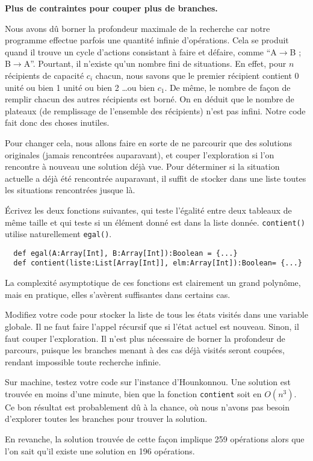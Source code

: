 \documentclass[10pt]{article}\usepackage[correction,nu]{esial}%
\begin{document}
\begin{Exercice}
  \textbf{Plus de contraintes pour couper plus de branches.} 
  
  Nous avons dû borner la profondeur maximale de la recherche car notre
  programme effectue parfois une quantité infinie d'opérations. Cela se produit
  quand il trouve un cycle d'actions consistant à faire et défaire, comme
  ``A$\rightarrow$B ; B$\rightarrow$A''. Pourtant, il n'existe qu'un nombre fini
  de situations. En effet, pour $n$ récipients de capacité $c_i$ chacun, nous
  savons que le premier récipient contient 0 unité ou bien 1 unité ou bien 2
  \ldots ou bien $c_1$. De même, le nombre de façon de remplir chacun des autres
  récipients est borné. On en déduit que le nombre de plateaux (de remplissage
  de l'ensemble des récipients) n'est pas infini. Notre code fait donc des
  choses inutiles.

  Pour changer cela, nous allons faire en sorte de ne parcourir que des
  solutions originales (jamais rencontrées auparavant), et couper l'exploration
  si l'on rencontre à nouveau une solution déjà vue. Pour déterminer si la
  situation actuelle a déjà été rencontrée auparavant, il suffit de stocker dans
  une liste toutes les situations rencontrées jusque là.

  \Question Écrivez les deux fonctions suivantes, qui teste l'égalité entre deux
  tableaux de même taille et qui teste si un élément donné est dans la liste
  donnée. \texttt{contient()} utilise naturellement \texttt{egal()}.
\begin{Verbatim}
  def egal(A:Array[Int], B:Array[Int]):Boolean = {...}
  def contient(liste:List[Array[Int]], elm:Array[Int]):Boolean= {...}
\end{Verbatim}

La complexité asymptotique de ces fonctions est clairement un grand polynôme,
mais en pratique, elles s'avèrent suffisantes dans certains cas.

\Question Modifiez votre code pour stocker la liste de tous les états visités
dans une variable globale. Il ne faut faire l'appel récursif que si l'état
actuel est nouveau. Sinon, il faut couper l'exploration. Il n'est plus
nécessaire de borner la profondeur de parcours, puisque les branches menant à
des cas déjà visités seront coupées, rendant impossible toute recherche infinie.

\begin{Reponse}
  \newcommand*\FancyVerbStartString{// BEGIN SOLVE}
  \newcommand*\FancyVerbStopString{// END SOLVE}
\end{Reponse}

\Question Sur machine, testez votre code sur l'instance d'Hounkonnou. Une
solution est trouvée en moins d'une minute, bien que la fonction
\texttt{contient} soit en $O(n^3)$. Ce bon résultat est probablement dû à la
chance, où nous n'avons pas besoin d'explorer toutes les branches pour trouver
la solution.

En revanche, la solution trouvée de cette façon implique 259 opérations alors
que l'on sait qu'il existe une solution en 196 opérations.
\end{Exercice}
\end{document}
